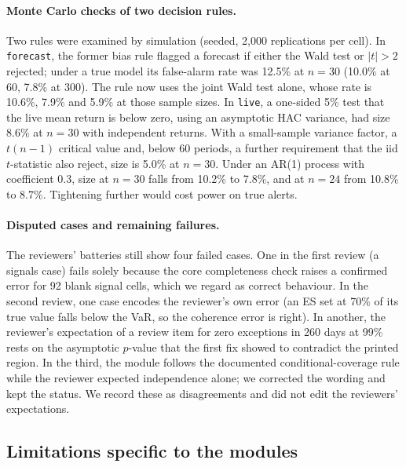 \documentclass[11pt]{article}
\begin{document}
\paragraph{Monte Carlo checks of two decision rules.} Two rules were examined by simulation (seeded, 2{,}000 replications per cell). In \texttt{forecast}, the former bias rule flagged a forecast if either the Wald test or $|t|>2$ rejected; under a true model its false-alarm rate was 12.5\% at $n=30$ (10.0\% at 60, 7.8\% at 300). The rule now uses the joint Wald test alone, whose rate is 10.6\%, 7.9\% and 5.9\% at those sample sizes. In \texttt{live}, a one-sided 5\% test that the live mean return is below zero, using an asymptotic HAC variance, had size 8.6\% at $n=30$ with independent returns. With a small-sample variance factor, a $t(n-1)$ critical value and, below 60 periods, a further requirement that the iid $t$-statistic also reject, size is 5.0\% at $n=30$. Under an AR(1) process with coefficient 0.3, size at $n=30$ falls from 10.2\% to 7.8\%, and at $n=24$ from 10.8\% to 8.7\%. Tightening further would cost power on true alerts.

\paragraph{Disputed cases and remaining failures.} The reviewers' batteries still show four failed cases. One in the first review (a signals case) fails solely because the core completeness check raises a confirmed error for 92 blank signal cells, which we regard as correct behaviour. In the second review, one case encodes the reviewer's own error (an ES set at 70\% of its true value falls below the VaR, so the coherence error is right). In another, the reviewer's expectation of a review item for zero exceptions in 260 days at 99\% rests on the asymptotic $p$-value that the first fix showed to contradict the printed region. In the third, the module follows the documented conditional-coverage rule while the reviewer expected independence alone; we corrected the wording and kept the status. We record these as disagreements and did not edit the reviewers' expectations.

\subsection{Limitations specific to the modules}
\end{document}
